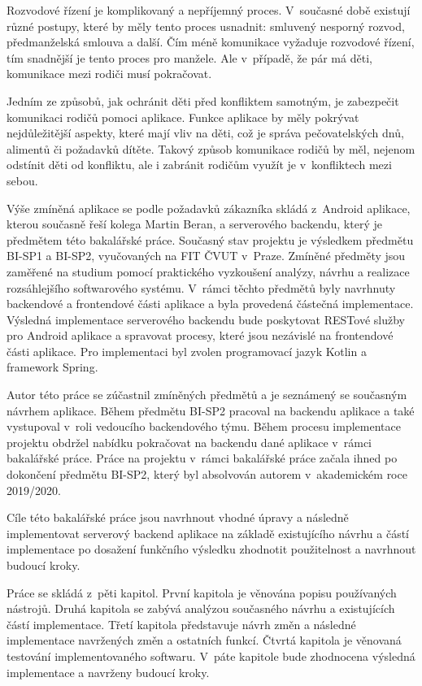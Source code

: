 Rozvodové řízení je komplikovaný a nepříjemný proces. V~současné době existují různé postupy, které by měly tento proces usnadnit: smluvený nesporný rozvod, předmanželská smlouva a další. Čím méně komunikace vyžaduje rozvodové řízení, tím snadnější je tento proces pro manžele. Ale v~případě, že pár má děti, komunikace mezi rodiči musí pokračovat. 

Jedním ze způsobů, jak ochránit děti před konfliktem samotným, je zabezpečit komunikaci rodičů pomoci aplikace. Funkce aplikace by měly pokrývat nejdůležitější aspekty, které mají vliv na děti, což je správa pečovatelských dnů, alimentů či požadavků dítěte. Takový způsob komunikace rodičů by měl, nejenom odstínit děti od konfliktu, ale i zabránit rodičům využít je v~konfliktech mezi sebou.

Výše zmíněná aplikace se podle požadavků zákazníka skládá z~Android aplikace, kterou současně řeší kolega Martin Beran, a serverového backendu, který je předmětem této bakalářské práce. Současný stav projektu je výsledkem předmětu BI-SP1 a BI-SP2, vyučovaných na FIT ČVUT v~Praze. Zmíněné předměty jsou zaměřené na studium pomocí praktického vyzkoušení analýzy, návrhu a realizace rozsáhlejšího softwarového systému. V~rámci těchto předmětů byly navrhnuty backendové a frontendové části aplikace a byla provedená částečná implementace. 
Výsledná implementace serverového backendu bude poskytovat RESTové služby pro Android aplikace a spravovat procesy, které jsou nezávislé na frontendové části aplikace. Pro implementaci byl zvolen programovací jazyk Kotlin a framework Spring. 

Autor této práce se zúčastnil zmíněných předmětů a je seznámený se současným návrhem aplikace. Během předmětu BI-SP2 pracoval na backendu aplikace a také vystupoval v~roli vedoucího backendového týmu. Během procesu implementace projektu obdržel nabídku pokračovat na backendu dané aplikace v~rámci bakalářské práce. Práce na projektu v~rámci bakalářské práce začala ihned po dokončení předmětu BI-SP2, který byl absolvován autorem v~akademickém roce 2019/2020.

Cíle této bakalářské práce jsou navrhnout vhodné úpravy a následně implementovat serverový backend aplikace na základě existujícího návrhu a částí implementace po dosažení funkčního výsledku zhodnotit použitelnost a navrhnout budoucí kroky.

Práce se skládá z~pěti kapitol. První kapitola je věnována popisu používaných nástrojů. Druhá kapitola se zabývá analýzou současného návrhu a existujících částí implementace. Třetí kapitola představuje návrh změn a následné implementace navržených změn a ostatních funkcí. Čtvrtá kapitola je věnovaná testování implementovaného softwaru. V~páte kapitole bude zhodnocena výsledná implementace a navrženy budoucí kroky.






